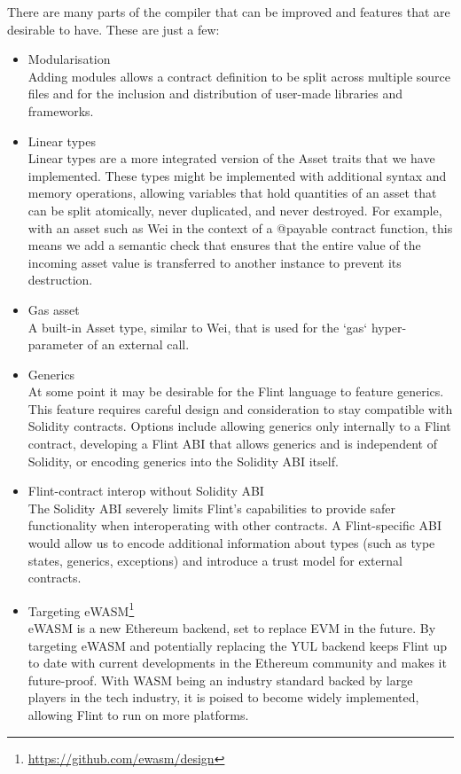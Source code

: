 There are many parts of the compiler that can be improved and features that are desirable to have. These are just a few:

\begin{itemize}
	\item Modularisation\\
Adding modules allows a contract definition to be split across multiple source files and for the inclusion and distribution of user-made libraries and frameworks.
	\item Linear types\\
Linear types are a more integrated version of the Asset traits that we have implemented. These types might be implemented with additional syntax and memory operations, allowing variables that hold quantities of an asset that can be split atomically, never duplicated, and never destroyed\cite{flint-paper}. For example, with an asset such as Wei in the context of a @payable contract function, this means we add a semantic check that ensures that the entire value of the incoming asset value is transferred to another instance to prevent its destruction.
	\item Gas asset\\
A built-in Asset type, similar to Wei, that is used for the `gas` hyper-parameter of an external call.
	\item Generics\\
At some point it may be desirable for the Flint language to feature generics. This feature requires careful design and consideration to stay compatible with Solidity contracts. Options include allowing generics only internally to a Flint contract, developing a Flint ABI that allows generics and is independent of Solidity, or encoding generics into the Solidity ABI itself.
	\item Flint-contract interop without Solidity ABI\\
The Solidity ABI severely limits Flint's capabilities to provide safer functionality when interoperating with other contracts. A Flint-specific ABI would allow us to encode additional information about types (such as type states, generics, exceptions) and introduce a trust model for external contracts.
	\item Targeting eWASM\footnote{\url{https://github.com/ewasm/design}}\\
eWASM is a new Ethereum backend, set to replace EVM in the future. By targeting eWASM and potentially replacing the YUL backend keeps Flint up to date with current developments in the Ethereum community and makes it future-proof. With WASM being an industry standard backed by large players in the tech industry, it is poised to become widely implemented, allowing Flint to run on more platforms.

\end{itemize}
